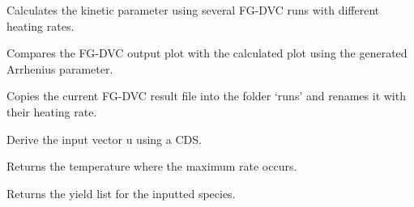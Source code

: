 \documentclass[letterpaper,10pt,english]{sphinxmanual}
\begin{document}
\begin{fulllineitems}
\label{Appendix:FGDVC_Fit_lin_regr.Process}
Calculates the kinetic parameter using several FG-DVC runs with different heating rates.

\begin{fulllineitems}
\label{Appendix:FGDVC_Fit_lin_regr.Process.CompareResults}
Compares the FG-DVC output plot with the calculated plot using the generated Arrhenius parameter.

\end{fulllineitems}


\begin{fulllineitems}
\label{Appendix:FGDVC_Fit_lin_regr.Process.CpFile}
Copies the current FG-DVC result file into the folder `runs' and renames it with their heating rate.

\end{fulllineitems}


\begin{fulllineitems}
\label{Appendix:FGDVC_Fit_lin_regr.Process.Derive}
Derive the input vector u using a CDS.

\end{fulllineitems}


\begin{fulllineitems}
\label{Appendix:FGDVC_Fit_lin_regr.Process.MaxRateTemp}
Returns the temperature where the maximum rate occurs.

\end{fulllineitems}


\begin{fulllineitems}
\label{Appendix:FGDVC_Fit_lin_regr.Process.Rate}
Returns the yield list for the inputted species.


\end{fulllineitems}
\end{fulllineitems}
\end{document}
